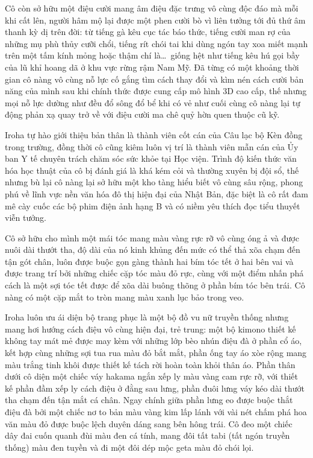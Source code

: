 \documentclass[../main.tex]{subfiles}
\begin{document}
Cô còn sở hữu một điệu cười mang âm điệu đặc trưng vô cùng độc đáo mà mỗi khi cất lên, người hâm mộ lại được một phen cười bò vì liên tưởng tới đủ thứ âm thanh kỳ dị trên đời: từ tiếng gà kêu cục tác báo thức, tiếng cười man rợ của những mụ phù thủy cưỡi chổi, tiếng rít chói tai khi dùng ngón tay xoa miết mạnh trên một tấm kính mỏng hoặc thậm chí là\dots\ giống hệt như tiếng kêu hú gọi bầy của lũ khỉ hoang dã ở khu vực rừng rậm Nam Mỹ. Đã từng có một khoảng thời gian cô nàng vô cùng nỗ lực cố gắng tìm cách thay đổi và kìm nén cách cười bản năng của mình sau khi chính thức được cung cấp mô hình 3D cao cấp, thế nhưng mọi nỗ lực dường như đều đổ sông đổ bể khi có vẻ như cuối cùng cô nàng lại tự động phản xạ quay trở về với điệu cười ma chê quỷ hờn quen thuộc cũ kỹ.

Iroha tự hào giới thiệu bản thân là thành viên cốt cán của Câu lạc bộ Kèn đồng trong trường, đồng thời cô cũng kiêm luôn vị trí là thành viên mẫn cán của Ủy ban Y tế chuyên trách chăm sóc sức khỏe tại Học viện. Trình độ kiến thức văn hóa học thuật của cô bị đánh giá là khá kém cỏi và thường xuyên bị đội sổ, thế nhưng bù lại cô nàng lại sở hữu một kho tàng hiểu biết vô cùng sâu rộng, phong phú về lĩnh vực nền văn hóa đô thị hiện đại của Nhật Bản, đặc biệt là cô rất đam mê cày cuốc các bộ phim điện ảnh hạng B và có niềm yêu thích đọc tiểu thuyết viễn tưởng.

Cô sở hữu cho mình một mái tóc mang màu vàng rực rỡ vô cùng óng ả và được nuôi dài thướt tha, độ dài của nó kinh khủng đến mức có thể thả xõa chạm đến tận gót chân, luôn được buộc gọn gàng thành hai bím tóc tết ở hai bên vai và được trang trí bởi những chiếc cặp tóc màu đỏ rực, cùng với một điểm nhấn phá cách là một sợi tóc tết được để xõa dài buông thõng ở phần bím tóc bên trái. Cô nàng có một cặp mắt to tròn mang màu xanh lục bảo trong veo.

Iroha luôn ưu ái diện bộ trang phục là một bộ đồ vu nữ truyền thống nhưng mang hơi hướng cách điệu vô cùng hiện đại, trẻ trung: một bộ kimono thiết kế không tay mát mẻ được may kèm với những lớp bèo nhún điệu đà ở phần cổ áo, kết hợp cùng những sợi tua rua màu đỏ bắt mắt, phần ống tay áo xòe rộng mang màu trắng tinh khôi được thiết kế tách rời hoàn toàn khỏi thân áo. Phần thân dưới cô diện một chiếc váy hakama ngắn xếp ly màu vàng cam rực rỡ, với thiết kế phần đầm xếp ly cách điệu ở đằng sau lưng, phần đuôi lưng váy kéo dài thướt tha chạm đến tận mắt cá chân. Ngay chính giữa phần lưng eo được buộc thắt điệu đà bởi một chiếc nơ to bản màu vàng kim lấp lánh với vài nét chấm phá hoa văn màu đỏ được buộc lệch duyên dáng sang bên hông trái. Cô đeo một chiếc dây đai cuốn quanh đùi màu đen cá tính, mang đôi tất tabi (tất ngón truyền thống) màu đen tuyền và đi một đôi dép mộc geta màu đỏ chói lọi.
\end{document}

